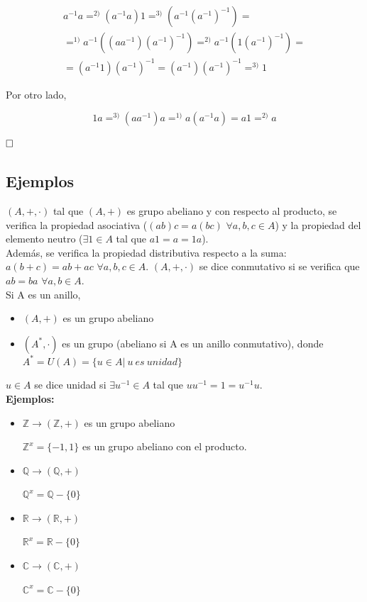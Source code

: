 \documentclass{article}
\begin{document}
\begin{equation*}
\begin{split}
a^{-1}a =^{2)}(a^{-1}a)1=^{3)}(a^{-1}(a^{-1})^{-1})= \\
=^{1)}a^{-1}((aa^{-1})(a^{-1})^{-1})=^{2)}a^{-1}(1(a^{-1})^{-1})= \\
=(a^{-1}1)(a^{-1})^{-1}=(a^{-1})(a^{-1})^{-1}=^{3)}1
\end{split}
\end{equation*}

Por otro lado,

\begin{equation*}
1a=^{3)}(aa^{-1})a=^{1)}a(a^{-1}a)=a1=^{2)}a
\end{equation*}

$\hfill\square$

\subsection{Ejemplos}

$(A,+,\cdot)$ tal que $(A,+)$ es grupo abeliano y con respecto al producto, se verifica la propiedad asociativa ($(ab)c=a(bc)$ $\forall a,b,c \in A$) y la propiedad del elemento neutro ($\exists 1 \in A$ tal que $a1=a=1a$). \\

Además, se verifica la propiedad distributiva respecto a la suma: $a(b+c)=ab+ac$ $\forall a,b,c \in A$. $(A,+,\cdot)$ se dice conmutativo si se verifica que $ab=ba$ $\forall a,b \in A$. \\

Si A es un anillo, 

\begin{itemize}
\item $(A,+)$ es un grupo abeliano

\item $(A^*, \cdot)$ es un grupo (abeliano si A es un anillo conmutativo), donde $A^*=U(A)=\{u\in A |~u~es~unidad\}$
\end{itemize}

$u \in A$ se dice unidad si $\exists u^{-1}\in A$ tal que $uu^{-1}=1=u^{-1}u$. \\

\textbf{Ejemplos:}
\begin{itemize}
\item $\mathbb{Z} \rightarrow (\mathbb{Z}, +)$ es un grupo abeliano 

$\mathbb{Z}^x=\{-1,1\}$ es un grupo abeliano con el producto.

\item $\mathbb{Q} \rightarrow (\mathbb{Q},+)$

$\mathbb{Q}^x=\mathbb{Q}-\{0\}$

\item $\mathbb{R} \rightarrow (\mathbb{R},+)$

$\mathbb{R}^x=\mathbb{R}-\{0\}$

\item $\mathbb{C} \rightarrow (\mathbb{C},+)$

$\mathbb{C}^x=\mathbb{C}-\{0\}$
\end{itemize}
\end{document}
